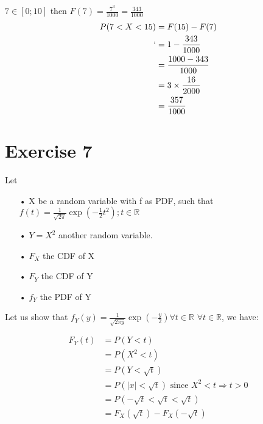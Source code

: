 \documentclass[11pt]{article}
\def\gt{>}
\def\lt{<}
\begin{document}
$7 \in \left[0 ; 10\right] $ then $F(7)=\frac{7^3}{1000}=\frac{343}{1000}$
\begin{align*}
P(7 \lt X \lt 15) &= F(15)-F(7) \\
`                 &=1-\frac{343}{1000}\\ 
 			 	  &=\frac{1000-343}{1000}\\
 			 	  &= 3\times \frac{16}{2000}\\
 			 	  &= \frac{357}{1000}\\  
\end{align*}




    
    
    
    
\newpage 
    \section{Exercise 7}
    Let 
    \begin{itemize}
    \item[•] X be a random variable with f as PDF, such that
      $ f(t)=\frac{1}{\sqrt{2\pi}}\exp(-\frac{1}{2}t^2 ) ; t\in \mathbb{R}$
      \item[•] $Y=X^2$ another random variable.
      \item[•] $F_X$ the CDF of X
      \item[•] $F_Y$ the CDF of Y
      \item[•] $f_Y$ the PDF of Y
    \end{itemize}
    Let us show that $f_Y(y)=\frac{1}{\sqrt{2\pi y}}\exp(-\frac{y}{2}) \forall t\in \mathbb{R}$
   $\forall t\in \mathbb{R}$, we have:
   
\begin{align*}
    F_Y(t) &= P(Y < t) \\
           &= P(X^2 < t) \\
           &= P(Y < \sqrt{t})\\
           &= P(\lvert x \rvert < \sqrt{t}) \text{ since } X^2 \lt t \Rightarrow t \gt 0\\           
           &= P(-\sqrt{t} \lt  \sqrt{t} \lt \sqrt{t} ) \\ 
           &=  F_X(\sqrt{t})-F_X(-\sqrt{t})                    
\end{align*}
\end{document}
